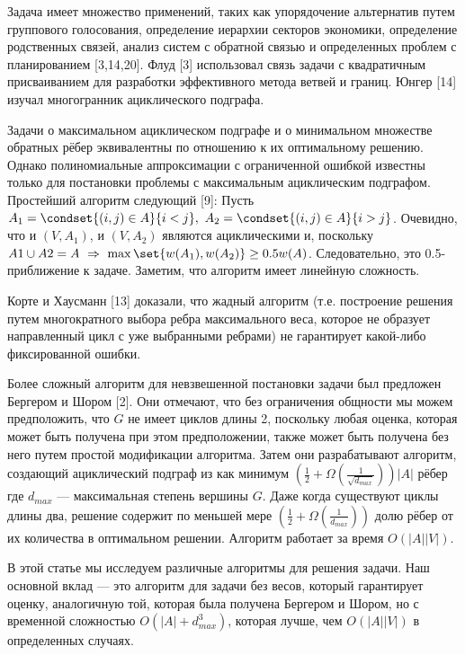 \documentclass[a4paper, 12pt, oneside]{extarticle}  %
\begin{document}
Задача имеет множество применений, таких как упорядочение альтернатив путем группового голосования,
определение иерархии секторов экономики, определение родственных связей, анализ систем с обратной
связью и определенных проблем с планированием [3,14,20]. Флуд [3] использовал связь задачи с квадратичным
присваиванием для разработки эффективного метода ветвей и границ. Юнгер [14] изучал многогранник ациклического подграфа.

Задачи о максимальном ациклическом подграфе и о минимальном множестве обратных рёбер эквивалентны по отношению к их оптимальному решению. Однако полиномиальные аппроксимации с ограниченной ошибкой известны только для постановки проблемы с максимальным ациклическим подграфом. Простейший алгоритм следующий [9]: Пусть $A_1 = \condset{(i, j) \in A}{i < j},\ A_2 = \condset{(i, j) \in A}{i > j}$. Очевидно, что и $(V, A_1)$, и $(V, A_2)$ являются ациклическими и, поскольку $A1 \cup A2 = A \ \Rightarrow \ \max\set{w(A_1), w(A_2)} \ge 0.5w(A)$. Следовательно, это 0.5-приближение к задаче. Заметим, что алгоритм имеет линейную сложность.

Корте и Хаусманн [13] доказали, что жадный алгоритм (т.е. построение решения путем многократного выбора ребра максимального веса, которое не образует направленный цикл с уже выбранными ребрами) не гарантирует какой-либо фиксированной ошибки.

Более сложный алгоритм для невзвешенной постановки задачи был предложен Бергером и Шором [2]. Они отмечают, что без ограничения общности мы можем предположить, что $G$ не имеет циклов длины 2, поскольку любая оценка, которая может быть получена при этом предположении, также может быть получена без него путем простой модификации алгоритма. Затем они разрабатывают алгоритм, создающий ациклический подграф из как минимум $(\frac{1}{2} + \Omega(\frac{1}{\sqrt{d_{max}}}))|A|$ рёбер где $d_{max}$ --- максимальная степень вершины $G$. Даже когда существуют циклы длины два, решение содержит по меньшей мере $(\frac{1}{2} + \Omega(\frac{1}{d_{max}}))$ долю рёбер от их количества в оптимальном решении. Алгоритм работает за время $O(|A||V|)$.

В этой статье мы исследуем различные алгоритмы для решения задачи. Наш основной вклад --- это алгоритм для задачи без весов, который гарантирует оценку, аналогичную той, которая была получена Бергером и Шором, но с временной сложностью $O(|A| + d_{max}^3)$, которая лучше, чем $O(|A||V|)$ в определенных случаях.

\end{document}

